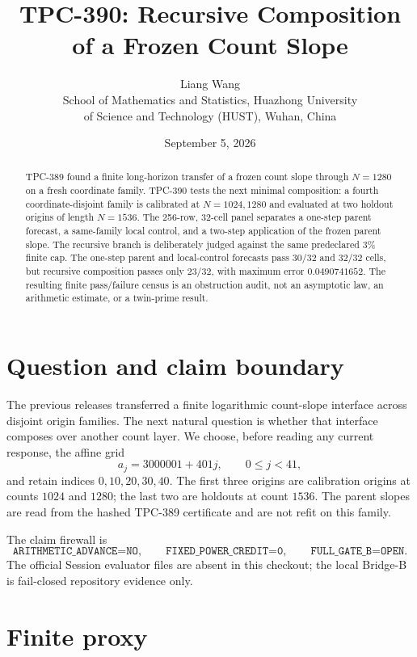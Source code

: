 \documentclass[10pt]{article}
\title{TPC-390: Recursive Composition of a Frozen Count Slope}
\author{Liang Wang\\
School of Mathematics and Statistics, Huazhong University\\
of Science and Technology (HUST), Wuhan, China}
\date{September 5, 2026}
\begin{document}
\maketitle

\begin{abstract}
TPC-389 found a finite long-horizon transfer of a frozen count slope through
$N=1280$ on a fresh coordinate family.  TPC-390 tests the next minimal
composition: a fourth coordinate-disjoint family is calibrated at
$N=1024,1280$ and evaluated at two holdout origins of length $N=1536$.
The 256-row, 32-cell panel separates a one-step parent forecast, a
same-family local control, and a two-step application of the frozen parent
slope.  The recursive branch is deliberately judged against the same
predeclared 3\% finite cap.  The one-step parent and local-control forecasts
pass $30/32$ and $32/32$ cells, but recursive composition passes only
$23/32$, with maximum error $0.0490741652$.  The resulting finite
pass/failure census is an obstruction audit, not an asymptotic law, an
arithmetic estimate, or a twin-prime result.
\end{abstract}

\section{Question and claim boundary}

The previous releases transferred a finite logarithmic count-slope interface
across disjoint origin families.  The next natural question is whether that
interface composes over another count layer.  We choose, before reading any
current response, the affine grid
\[
 a_j=3000001+401j,\qquad 0\leq j<41,
\]
and retain indices $0,10,20,30,40$.  The first three origins are calibration
origins at counts $1024$ and $1280$; the last two are holdouts at count
$1536$.  The parent slopes are read from the hashed TPC-389 certificate and
are not refit on this family.

The claim firewall is
\[
 \texttt{ARITHMETIC\_ADVANCE=NO},\qquad
 \texttt{FIXED\_POWER\_CREDIT=0},\qquad
 \texttt{FULL\_GATE\_B=OPEN}.
\]
The official Session evaluator files are absent in this checkout; the local
Bridge-B is fail-closed repository evidence only.

\section{Finite proxy}
\end{document}
